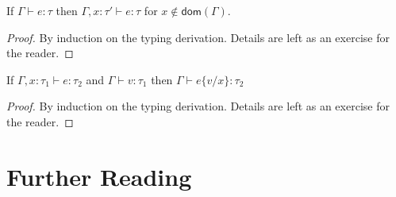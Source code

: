 \begin{lemma}[Weakening]
  If $\Gamma\vdash e : \tau$ then $\Gamma, x:\tau' \vdash e : \tau$
  for $x\not\in \textsf{dom}(\Gamma)$.
\end{lemma}
\begin{proof}
  By induction on the typing derivation.
  Details are left as an exercise for the reader.
\end{proof}

\begin{lemma}[Substitution]
  If $\Gamma, x:\tau_1 \vdash e : \tau_2$ and $\Gamma\vdash v : \tau_1$
  then $\Gamma\vdash e\{v/x\} : \tau_2$
\end{lemma}
\begin{proof}
  By induction on the typing derivation.
  Details are left as an exercise for the reader.
\end{proof}

\section{Further Reading}

